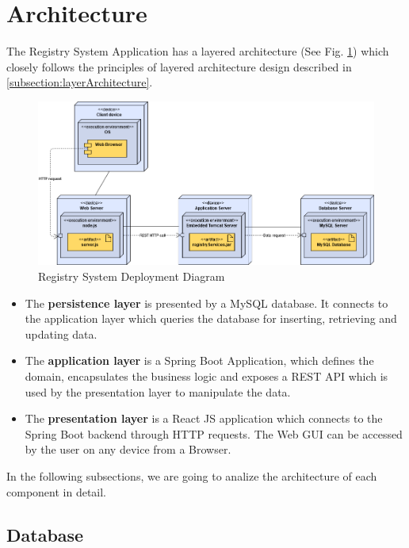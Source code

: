 \section{Architecture}
\label{section:architecture}

The Registry System Application has a layered architecture (See Fig. \ref{deployment}) which closely follows the principles of layered architecture design described in \ref{subsection:layerArchitecture}.

\begin{figure}[H]
    \centering
    \includegraphics[width=6.5in]{images/deployment}
    \caption{Registry System Deployment Diagram}
    \label{deployment}
\end{figure}

\begin{itemize}
    \item The \textbf{persistence layer} is presented by a MySQL database. It connects to the application layer which queries the database for inserting, retrieving and updating data.
    \item The \textbf{application layer} is a Spring Boot Application, which defines the domain, encapsulates the business logic and exposes a REST API which is used by the presentation layer to manipulate the data.
    \item The \textbf{presentation layer} is a React JS application which connects to the Spring Boot backend through HTTP requests. The Web GUI can be accessed by the user on any device from a Browser.
\end{itemize}

In the following subsections, we are going to analize the architecture of each component in detail.



\subsection{Database}
\label{subsection:dbLayer}

